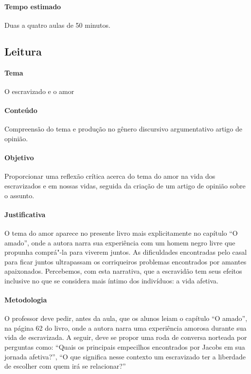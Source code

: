 \documentclass[11pt]{extarticle}
\begin{document}
 \paragraph{Tempo estimado} Duas a quatro aulas de 50 minutos.


\subsection{Leitura}

 \paragraph{Tema} O escravizado e o amor

 \paragraph{Conteúdo} Compreensão do tema e produção no gênero discursivo 
 argumentativo artigo de opinião.

 \paragraph{Objetivo} Proporcionar uma reflexão crítica acerca do tema do amor
 na vida dos escravizados e em nossas vidas, seguida da criação de um artigo de opinião
 sobre o assunto.

 \paragraph{Justificativa} O tema do amor aparece no presente livro mais explicitamente
 no capítulo ``O amado'', onde a autora narra sua experiência com um 
 homem negro livre que propunha comprá"-la para viverem juntos. As dificuldades 
 encontradas pelo casal para ficar juntos ultrapassam os corriqueiros problemas
 encontrados por amantes apaixonados. Percebemos, com esta narrativa, que a escravidão
 tem seus efeitos inclusive no que se considera mais íntimo dos indivíduos: a vida
 afetiva.

 \paragraph{Metodologia}
    O professor deve pedir, antes da aula, que os alunos leiam o capítulo ``O amado'', 
    na página 62 do livro, onde a autora narra uma experiência amorosa durante 
    sua vida de escravizada.
    A seguir, deve se propor uma roda de conversa norteada por perguntas como:
    ``Quais os principais empecilhos encontrados por Jacobs em sua jornada afetiva?'',
    ``O que significa nesse contexto um escravizado ter a liberdade de escolher
    com quem irá se relacionar?''
\end{document}
